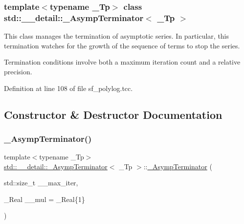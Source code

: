 \subsubsection*{template$<$typename \+\_\+\+Tp$>$\newline
class std\+::\+\_\+\+\_\+detail\+::\+\_\+\+Asymp\+Terminator$<$ \+\_\+\+Tp $>$}

This class manages the termination of asymptotic series. In particular, this termination watches for the growth of the sequence of terms to stop the series.

Termination conditions involve both a maximum iteration count and a relative precision. 

Definition at line 108 of file sf\+\_\+polylog.\+tcc.



\subsection{Constructor \& Destructor Documentation}
\mbox{\label{classstd_1_1____detail_1_1__AsympTerminator_a2a052a2ebedaa33cae3a6c07d73ca9cf}} 
\subsubsection{\texorpdfstring{\+\_\+\+Asymp\+Terminator()}{\_AsympTerminator()}}
{\footnotesize\ttfamily template$<$typename \+\_\+\+Tp$>$ \\
\hyperlink{classstd_1_1____detail_1_1__AsympTerminator}{std\+::\+\_\+\+\_\+detail\+::\+\_\+\+Asymp\+Terminator}$<$ \+\_\+\+Tp $>$\+::\hyperlink{classstd_1_1____detail_1_1__AsympTerminator}{\+\_\+\+Asymp\+Terminator} (\begin{DoxyParamCaption}\item[{std\+::size\+\_\+t}]{\+\_\+\+\_\+max\+\_\+iter,  }\item[{\+\_\+\+Real}]{\+\_\+\+\_\+mul = {\ttfamily \+\_\+Real\{1\}} }\end{DoxyParamCaption})\hspace{0.3cm}{\ttfamily [inline]}}



